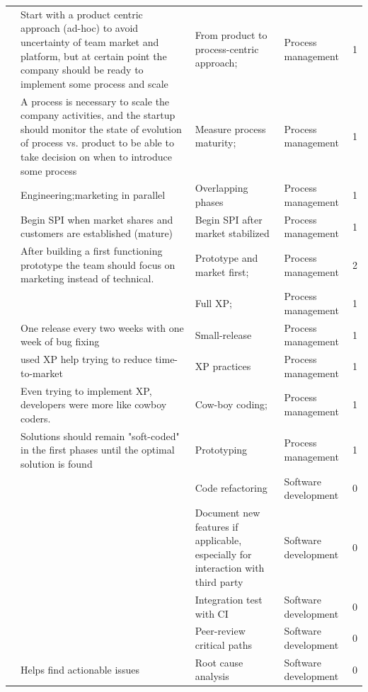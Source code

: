 \documentclass[final,5p,times,twocolumn]{elsarticle}
\begin{document}
\begin{center}
\begin{longtable}{|p{0.4in}|p{3in}|p{1.3in}|p{1in}|p{0.3in}|}
\cite{Heitlager2007} & Start with a product centric approach (ad-hoc) to avoid uncertainty of team market and platform, but at certain point the company should be ready to implement some process and scale & From product to process-centric approach; & Process management & 1 \\
\cite{Heitlager2007} & A process is necessary to scale the company activities, and the startup should monitor the state of evolution of process vs. product to be able to take decision on when to introduce some process & Measure process maturity; & Process management & 1 \\
\cite{Camel1994a} & Engineering;marketing in parallel & Overlapping phases & Process management & 1 \\
\cite{Crowne2002} & Begin SPI when market shares and customers are established (mature) & Begin SPI after market stabilized & Process management & 1 \\
\cite{Kakati2003} & After building a first functioning prototype the team should focus on marketing instead of technical. & Prototype and market first; & Process management & 2 \\
\cite{Silva2005} &       & Full XP; & Process management & 1 \\
\cite{Silva2005} & One release every two weeks with one week of bug fixing & Small-release & Process management & 1 \\
\cite{Silva2005} & used XP help trying to reduce time-to-market & XP practices & Process management & 1 \\
\cite{Silva2005} & Even trying to implement XP, developers were more like cowboy coders. & Cow-boy coding; & Process management & 1 \\
\cite{Deakins2005} & Solutions should remain "soft-coded" in the first phases until the optimal solution is found & Prototyping & Process management & 1 \\
\cite{Taipale2010} &       & Code refactoring & Software development & 0 \\
\cite{Taipale2010} &       & Document new features if applicable, especially for interaction with third party & Software development & 0 \\
\cite{Taipale2010} &       & Integration test with CI & Software development & 0 \\
\cite{Taipale2010} &       & Peer-review critical paths & Software development & 0 \\
\cite{Taipale2010} & Helps find actionable issues & Root cause analysis & Software development & 0 \\

\end{longtable}
\end{center}
\end{document}
